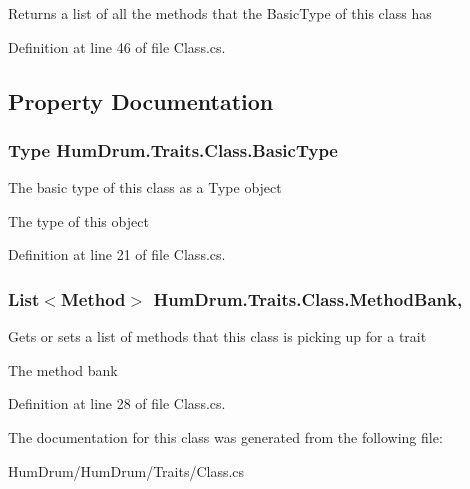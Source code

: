 Returns a list of all the methods that the Basic\+Type of this class has 



Definition at line 46 of file Class.\+cs.



\subsection{Property Documentation}
\subsubsection[{\texorpdfstring{Basic\+Type}{BasicType}}]{\setlength{\rightskip}{0pt plus 5cm}Type Hum\+Drum.\+Traits.\+Class.\+Basic\+Type\hspace{0.3cm}{\ttfamily [get]}}\hypertarget{classHumDrum_1_1Traits_1_1Class_a146baaecb2ca81709f723ad6a6adf681}{}\label{classHumDrum_1_1Traits_1_1Class_a146baaecb2ca81709f723ad6a6adf681}


The basic type of this class as a Type object 

The type of this object

Definition at line 21 of file Class.\+cs.

\subsubsection[{\texorpdfstring{Method\+Bank}{MethodBank}}]{\setlength{\rightskip}{0pt plus 5cm}List$<${\bf Method}$>$ Hum\+Drum.\+Traits.\+Class.\+Method\+Bank\hspace{0.3cm}{\ttfamily [get]}, {\ttfamily [set]}}\hypertarget{classHumDrum_1_1Traits_1_1Class_a083806fde4d821c062591788cfaff75b}{}\label{classHumDrum_1_1Traits_1_1Class_a083806fde4d821c062591788cfaff75b}


Gets or sets a list of methods that this class is picking up for a trait 

The method bank

Definition at line 28 of file Class.\+cs.



The documentation for this class was generated from the following file\+:\begin{DoxyCompactItemize}
\item 
Hum\+Drum/\+Hum\+Drum/\+Traits/Class.\+cs\end{DoxyCompactItemize}
